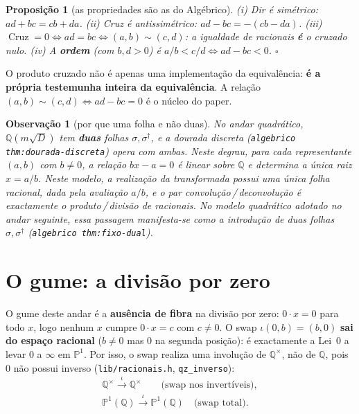 \documentclass[11pt,a4paper]{article}
\newtheorem{proposicao}[teorema]{Proposição}
\newtheorem{observacao}{Observação}
\newcommand{\code}[1]{\texttt{\small #1}}
\newcommand{\dg}{^{\dagger}}
\begin{document}
\begin{proposicao}[as propriedades são as do Algébrico]\label{prop:dircr}
\emph{(i)} Dir é simétrico: $ad+bc=cb+da$. \emph{(ii)} Cruz é
antissimétrico: $ad-bc=-(cb-da)$. \emph{(iii)} $\operatorname{Cruz}=0 \iff
ad=bc \iff (a,b)\sim(c,d)$: a igualdade de racionais \textbf{é} o cruzado
nulo. \emph{(iv)} A \textbf{ordem} (com $b,d>0$) é
$a/b < c/d \iff ad-bc<0$. $\square$
\end{proposicao}

\noindent O produto cruzado não é apenas uma implementação da equivalência:
\textbf{é a própria testemunha inteira da equivalência}. A relação
$(a,b)\sim(c,d)\iff ad-bc=0$ é o núcleo do paper.

\begin{observacao}[por que uma folha e não duas]
No andar quadrático, $\mathbb{Q}(m\sqrt D)$ tem \textbf{duas} folhas
$\sigma,\sigma\dg$, e a dourada discreta (\code{algebrico
thm:dourada-discreta}) opera com ambas. Neste degrau, para cada representante $(a,b)$ com $b\neq0$, a
relação $bx-a=0$ é linear sobre $\mathbb{Q}$ e determina a única raiz
$x=a/b$. Neste modelo, a realização da transformada possui uma única folha
racional, dada pela avaliação $a/b$, e o par
convolução\,/\,deconvolução é exactamente o produto\,/\,divisão de
racionais. No modelo quadrático adotado no andar seguinte, essa passagem
manifesta-se como a introdução de duas folhas $\sigma,\sigma\dg$
(\code{algebrico thm:fixo-dual}).
\end{observacao}

\section{O gume: a divisão por zero}\label{sec:gume}

O gume deste andar é a \textbf{ausência de fibra} na divisão por zero:
$0\cdot x = 0$ para todo $x$, logo nenhum $x$ cumpre $0\cdot x=c$ com
$c\neq 0$. O swap $\iota(0,b)=(b,0)$ \textbf{sai do espaço racional}
($b\neq 0$ mas $0$ na segunda posição): é exactamente a Lei~$0$ a levar $0$
a $\infty$ em $\mathbb{P}^{1}$. Por isso, o swap realiza uma involução de
$\mathbb{Q}^{\times}$, não de $\mathbb{Q}$, pois $0$ não possui inverso
(\code{lib/racionais.h}, \code{qz\_inverso}):
\[
\boxed{
\begin{array}{c}
\mathbb{Q}^{\times}
\overset{\iota}{\longrightarrow}
\mathbb{Q}^{\times}
\qquad\text{(swap nos invertíveis)},\\[4pt]
\mathbb{P}^{1}(\mathbb{Q})
\overset{\iota}{\longrightarrow}
\mathbb{P}^{1}(\mathbb{Q})
\quad\text{(swap total)}.
\end{array}}
\]
\end{document}
